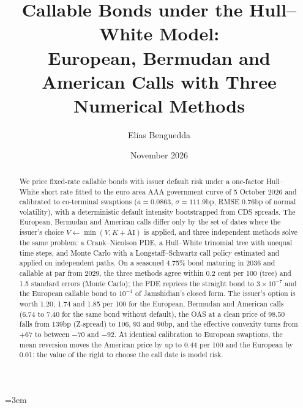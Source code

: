 \documentclass[11pt,a4paper]{article}
\title{Callable Bonds under the Hull--White Model:\\
European, Bermudan and American Calls with Three Numerical Methods}
\author{Elias Benguedda}
\date{November 2026}
\newcommand{\AI}{\mathrm{AI}}
\begin{document}
\emergencystretch=3em
\maketitle

\begin{abstract}
We price fixed-rate callable bonds with issuer default risk under a one-factor Hull--White short rate fitted to the
euro area AAA government curve of 5 October 2026 and calibrated to co-terminal swaptions ($a = 0.0863$,
$\sigma = 111.9$bp, RMSE 0.76bp of normal volatility), with a deterministic default intensity bootstrapped from CDS
spreads. The European, Bermudan and American calls differ only by the set of dates where the issuer's choice
$V \leftarrow \min(V, K + \AI)$ is applied, and three independent methods solve the same problem: a Crank--Nicolson
PDE, a Hull--White trinomial tree with unequal time steps, and Monte Carlo with a Longstaff--Schwartz call policy
estimated and applied on independent paths. On a seasoned 4.75\% bond maturing in 2036 and callable at par from
2029, the three methods agree within 0.2 cent per 100 (tree) and 1.5 standard errors (Monte Carlo); the PDE
reprices the straight bond to $3\times10^{-7}$ and the European callable bond to $10^{-4}$ of Jamshidian's closed
form. The issuer's option is worth 1.20, 1.74 and 1.85 per 100 for the European, Bermudan and American calls (6.74
to 7.40 for the same bond without default), the OAS at a clean price of 98.50 falls from 139bp (Z-spread) to 106,
93 and 90bp, and the effective convexity turns from $+67$ to between $-70$ and $-92$. At identical calibration to
European swaptions, the mean reversion moves the American price by up to 0.44 per 100 and the European by 0.01:
the value of the right to choose the call date is model risk.
\end{abstract}

\tableofcontents
\newpage

\end{document}
